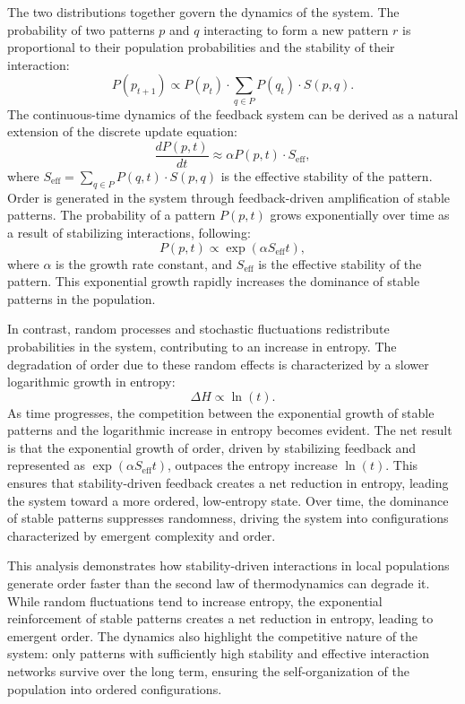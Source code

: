 \documentclass[entropy,article,submit,pdftex,moreauthors]{Definitions/mdpi}
\begin{document}
The two distributions together govern the dynamics of the system. The probability of two patterns \( p \) and \( q \) interacting to form a new pattern \( r \) is proportional to their population probabilities and the stability of their interaction:
\[
P(p_{t+1}) \propto P(p_t) \cdot \sum_{q \in P} P(q_t) \cdot S(p, q).
\]
The continuous-time dynamics of the feedback system can be derived as a natural extension of the discrete update equation:
\[
\frac{dP(p, t)}{dt} \approx \alpha P(p, t) \cdot S_{\text{eff}},
\]
where \( S_{\text{eff}} = \sum_{q \in P} P(q, t) \cdot S(p, q) \) is the effective stability of the pattern. Order is generated in the system through feedback-driven amplification of stable patterns. The probability of a pattern \( P(p, t) \) grows exponentially over time as a result of stabilizing interactions, following:
\[
P(p, t) \propto \exp(\alpha S_{\text{eff}} t),
\]
where \( \alpha \) is the growth rate constant, and \( S_{\text{eff}} \) is the effective stability of the pattern. This exponential growth rapidly increases the dominance of stable patterns in the population.

In contrast, random processes and stochastic fluctuations redistribute probabilities in the system, contributing to an increase in entropy. The degradation of order due to these random effects is characterized by a slower logarithmic growth in entropy:
\[
\Delta H \propto \ln(t).
\]
As time progresses, the competition between the exponential growth of stable patterns and the logarithmic increase in entropy becomes evident. The net result is that the exponential growth of order, driven by stabilizing feedback and represented as \( \exp(\alpha S_{\text{eff}} t) \), outpaces the entropy increase \( \ln(t) \). This ensures that stability-driven feedback creates a net reduction in entropy, leading the system toward a more ordered, low-entropy state. Over time, the dominance of stable patterns suppresses randomness, driving the system into configurations characterized by emergent complexity and order.

This analysis demonstrates how stability-driven interactions in local populations generate order faster than the second law of thermodynamics can degrade it. While random fluctuations tend to increase entropy, the exponential reinforcement of stable patterns creates a net reduction in entropy, leading to emergent order. The dynamics also highlight the competitive nature of the system: only patterns with sufficiently high stability and effective interaction networks survive over the long term, ensuring the self-organization of the population into ordered configurations.
\end{document}
